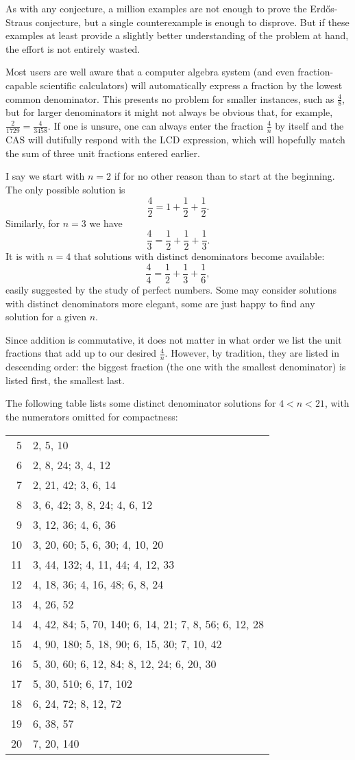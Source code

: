 \documentclass[12pt]{article}
\begin{document}
As with any conjecture, a million examples are not enough to prove the Erd\H{o}s-Straus conjecture, but a single counterexample is enough to disprove. But if these examples at least provide a slightly better understanding of the problem at hand, the effort is not entirely wasted.

Most users are well aware that a computer algebra system (and even fraction-capable scientific calculators) will automatically express a fraction by the lowest common denominator. This presents no problem for smaller instances, such as $\frac{4}{8}$, but for larger denominators it might not always be obvious that, for example, $\frac{2}{1729} = \frac{4}{3458}$. If one is unsure, one can always enter the fraction $\frac{4}{n}$ by itself and the CAS will dutifully respond with the LCD expression, which will hopefully match the sum of three unit fractions entered earlier.

I say we start with $n = 2$ if for no other reason than to start at the beginning. The only possible solution is $$\frac{4}{2} = 1 + \frac{1}{2} + \frac{1}{2}.$$ Similarly, for $n = 3$ we have $$\frac{4}{3} = \frac{1}{2} + \frac{1}{2} + \frac{1}{3}.$$ It is with $n = 4$ that solutions with distinct denominators become available: $$\frac{4}{4} = \frac{1}{2} + \frac{1}{3} + \frac{1}{6},$$ easily suggested by the study of perfect numbers. Some may consider solutions with distinct denominators more elegant, some are just happy to find any solution for a given $n$.

Since addition is commutative, it does not matter in what order we list the unit fractions that add up to our desired $\frac{4}{n}$. However, by tradition, they are listed in descending order: the biggest fraction (the one with the smallest denominator) is listed first, the smallest last.

The following table lists some distinct denominator solutions for $4 < n < 21$, with the numerators omitted for compactness:

\begin{tabular}{|r|l|}
5 & 2, 5, 10 \\
6 & 2, 8, 24; 3, 4, 12 \\
7 & 2, 21, 42; 3, 6, 14 \\
8 & 3, 6, 42; 3, 8, 24; 4, 6, 12 \\
9 & 3, 12, 36; 4, 6, 36 \\
10 & 3, 20, 60; 5, 6, 30; 4, 10, 20 \\
11 & 3, 44, 132; 4, 11, 44; 4, 12, 33 \\
12 & 4, 18, 36; 4, 16, 48; 6, 8, 24 \\
13 & 4, 26, 52 \\
14 & 4, 42, 84; 5, 70, 140; 6, 14, 21; 7, 8, 56; 6, 12, 28 \\
15 & 4, 90, 180; 5, 18, 90; 6, 15, 30; 7, 10, 42 \\
16 & 5, 30, 60; 6, 12, 84; 8, 12, 24; 6, 20, 30 \\
17 & 5, 30, 510; 6, 17, 102 \\
18 & 6, 24, 72; 8, 12, 72 \\
19 & 6, 38, 57 \\
20 & 7, 20, 140 \\
\end{tabular}
\end{document}
